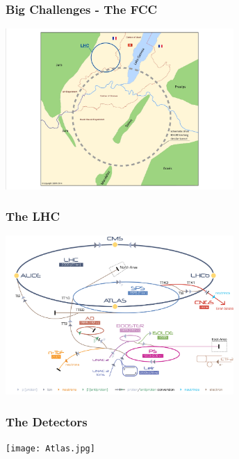 \documentclass[aspectratio=169]{beamer}
\begin{document}

\begin{frame}
    \frametitle{Big Challenges - The FCC}
    \begin{center}
        \includegraphics[width=0.65\textwidth,trim=4 4 4 4,clip]{CERN_LCC.jpg}
    \end{center}
\end{frame}


\begin{frame}
    \frametitle{The LHC}
    \begin{center}
        \includegraphics[width=0.65\textwidth,trim=4 4 4 4,clip]
            {Cern-Accelerator-Complex2.jpg}
    \end{center}
\end{frame}


\begin{frame}
    \frametitle{The Detectors}
    \begin{center}
        \vspace{-1em}
        \texttt{[image: Atlas.jpg]}
    \end{center}
\end{frame}
\end{document}
